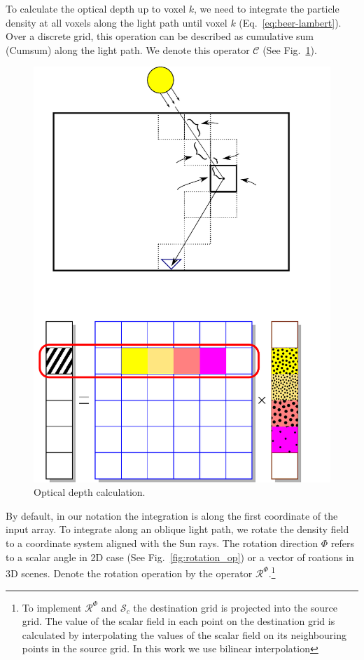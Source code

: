 \documentclass[10pt,twocolumn,letterpaper]{article}
\newcommand{\OpSphere}{\bm{\mathcal{S}}}
\newcommand{\OpRot}{\bm{\mathcal{R}}}
\newcommand{\OpCumsum}{\bm{\mathcal{C}}}
\begin{document}
To calculate the optical depth up to voxel $k$, we need to integrate
the particle density at all voxels along the light path until voxel
$k$ (Eq.~\ref{eq:beer-lambert}).  Over a discrete grid, this operation
can be described as cumulative sum (Cumsum) along the light path.  We
denote this operator $\OpCumsum$ (See Fig.~\ref{fig:cumsum_op}).
\begin{figure}
  \centering 
    \includegraphics[width=\columnwidth]{images/optical_distance.pdf}
    \caption{Optical depth calculation.}
  \label{fig:cumsum_op}
\end{figure}
By default, in our notation the integration is along the first
coordinate of the input array. To integrate along an oblique light
path, we rotate the density field to a coordinate system aligned with
the Sun rays.  The rotation direction $\Phi$ refers to a scalar angle
in 2D case (See Fig.~\ref{fig:rotation_op}) or a vector of roations in
3D scenes. Denote the rotation operation by the operator
$\OpRot^{\Phi}$.\footnote{To implement $\OpRot^{\Phi}$ and
  $\OpSphere_c$ the destination grid is projected into the source
  grid. The value of the scalar field in each point on the destination
  grid is calculated by interpolating the values of the scalar field
  on its neighbouring points in the source grid. In this work we use
  bilinear interpolation}
\end{document}
